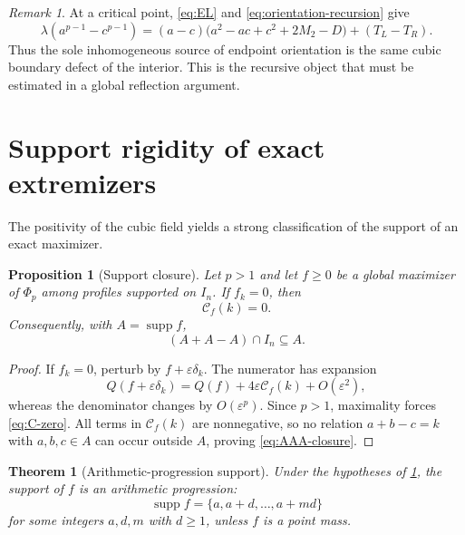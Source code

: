 \documentclass[11pt,reqno]{amsart}
\numberwithin{equation}{section}
\newtheorem{theorem}{Theorem}[section]
\newtheorem{proposition}[proposition]{Proposition}
\theoremstyle{definition}
\theoremstyle{remark}
\newtheorem{remark}[remark]{Remark}
\newcommand{\supp}{\operatorname{supp}}
\newcommand{\cC}{\mathcal C}
\begin{document}
\begin{remark}
At a critical point, \eqref{eq:EL} and
\eqref{eq:orientation-recursion} give
\[
  \lambda(a^{p-1}-c^{p-1})
  =(a-c)\bigl(a^2-ac+c^2+2M_2-D\bigr)+(T_L-T_R).
\]
Thus the sole inhomogeneous source of endpoint orientation is the same
cubic boundary defect of the interior.  This is the recursive object that
must be estimated in a global reflection argument.
\end{remark}

\section{Support rigidity of exact extremizers}

The positivity of the cubic field yields a strong classification of the
support of an exact maximizer.

\begin{proposition}[Support closure]\label{prop:support-closure}
Let $p>1$ and let $f\ge0$ be a global maximizer of $\Phi_p$ among profiles
supported on $I_n$.  If $f_k=0$, then
\begin{equation}\label{eq:C-zero}
  \cC_f(k)=0.
\end{equation}
Consequently, with $A=\supp f$,
\begin{equation}\label{eq:AAA-closure}
  (A+A-A)\cap I_n\subseteq A.
\end{equation}
\end{proposition}

\begin{proof}
If $f_k=0$, perturb by $f+\varepsilon\delta_k$.  The numerator has expansion
\[
  Q(f+\varepsilon\delta_k)
  =Q(f)+4\varepsilon\cC_f(k)+O(\varepsilon^2),
\]
whereas the denominator changes by $O(\varepsilon^p)$.  Since $p>1$,
maximality forces \eqref{eq:C-zero}.  All terms in $\cC_f(k)$ are
nonnegative, so no relation $a+b-c=k$ with $a,b,c\in A$ can occur outside
$A$, proving \eqref{eq:AAA-closure}.
\end{proof}

\begin{theorem}[Arithmetic-progression support]\label{thm:AP-support}
Under the hypotheses of \cref{prop:support-closure}, the support of $f$ is
an arithmetic progression:
\begin{equation}\label{eq:AP-support}
  \supp f=\{a,a+d,\ldots,a+md\}
\end{equation}
for some integers $a,d,m$ with $d\ge1$, unless $f$ is a point mass.
\end{theorem}
\end{document}
